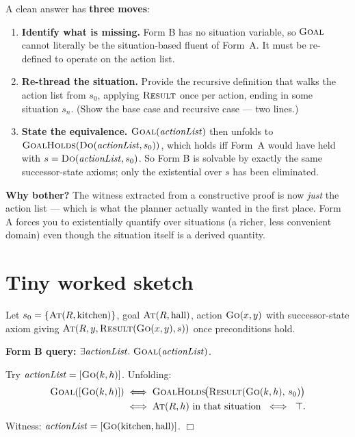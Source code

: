 \documentclass[11pt,a4paper]{article}
\newcommand{\pred}[1]{\textsc{#1}}
\begin{document}
A clean answer has \textbf{three moves}:

\begin{enumerate}[leftmargin=*,itemsep=2pt]
  \item \textbf{Identify what is missing.} Form B has no situation variable, so $\pred{Goal}$ cannot literally be the situation-based fluent of Form~A. It must be re-defined to operate on the action list.
  \item \textbf{Re-thread the situation.} Provide the recursive definition that walks the action list from $s_0$, applying $\pred{Result}$ once per action, ending in some situation $s_n$. (Show the base case and recursive case --- two lines.)
  \item \textbf{State the equivalence.} $\pred{Goal}(\mathit{actionList})$ then unfolds to $\pred{GoalHolds}(\pred{Do}(\mathit{actionList}, s_0))$, which holds iff Form~A would have held with $s = \pred{Do}(\mathit{actionList}, s_0)$. So Form B is solvable by exactly the same successor-state axioms; only the existential over $s$ has been eliminated.
\end{enumerate}

\textbf{Why bother?} The witness extracted from a constructive proof is now \emph{just} the action list --- which is what the planner actually wanted in the first place. Form A forces you to existentially quantify over situations (a richer, less convenient domain) even though the situation itself is a derived quantity.

\section*{Tiny worked sketch}

Let $s_0 = \{\pred{At}(R,\text{kitchen})\}$, goal $\pred{At}(R,\text{hall})$, action $\pred{Go}(x,y)$ with successor-state axiom giving $\pred{At}(R,y,\pred{Result}(\pred{Go}(x,y),s))$ once preconditions hold.

\textbf{Form B query:} $\exists \mathit{actionList}.\ \pred{Goal}(\mathit{actionList})$.

Try $\mathit{actionList} = [\pred{Go}(k,h)]$. Unfolding:
\begin{align*}
\pred{Goal}([\pred{Go}(k,h)])
&\iff \pred{GoalHolds}\!\big(\pred{Result}(\pred{Go}(k,h),\, s_0)\big)\\
&\iff \pred{At}(R, h) \text{ in that situation} \ \iff\ \top.
\end{align*}
Witness: $\mathit{actionList} = [\pred{Go}(\text{kitchen},\text{hall})]$. \hfill$\Box$
\end{document}
